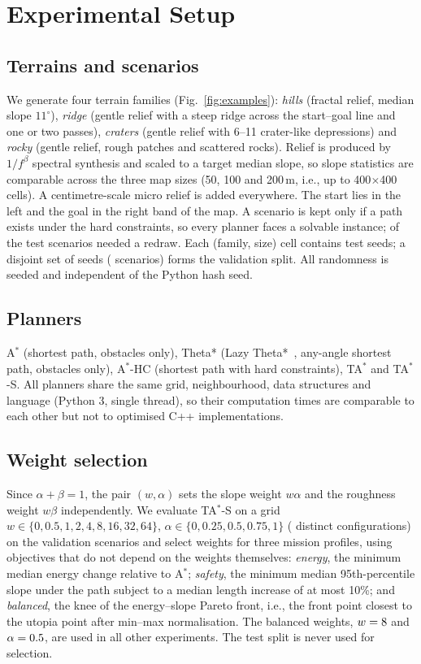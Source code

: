 \documentclass[conference]{IEEEtran}
\newcommand{\TAS}{TA$^*$-S}
\newcommand{\TA}{TA$^*$}
\newcommand{\Astar}{A$^*$}
\newcommand{\HC}{A$^*$-HC}
\begin{document}
\section{Experimental Setup}\label{sec:setup}
\subsection{Terrains and scenarios}
We generate four terrain families (Fig.~\ref{fig:examples}): \emph{hills}
(fractal relief, median slope $11^\circ$), \emph{ridge} (gentle relief with a
steep ridge across the start--goal line and one or two passes),
\emph{craters} (gentle relief with 6--11 crater-like depressions) and
\emph{rocky} (gentle relief, rough patches and scattered rocks). Relief is
produced by $1/f^\beta$ spectral synthesis and scaled to a target median slope,
so slope statistics are comparable across the three map sizes (50, 100 and
200\,m, i.e., up to 400$\times$400 cells). A centimetre-scale micro relief is
added everywhere. The start lies in the left and the goal in the right band
of the map. A scenario is kept only if a path exists under the hard
constraints, so every planner faces a solvable instance; \nRedraw{} of the
\nTest{} test scenarios needed a redraw. Each (family, size) cell contains
\nSeeds{} test seeds; a disjoint set of seeds (\nVal{} scenarios) forms the
validation split. All randomness is seeded and independent of the Python
hash seed.

\subsection{Planners}
\Astar{} (shortest path, obstacles only), Theta* (Lazy
Theta*~\cite{nash2010lazy}, any-angle shortest path, obstacles only), \HC{}
(shortest path with hard constraints), \TA{} and \TAS. All planners share the
same grid, neighbourhood, data structures and language (Python 3, single
thread), so their computation times are comparable to each other but not to
optimised C++ implementations.

\subsection{Weight selection}\label{sec:selection}
Since $\alpha+\beta=1$, the pair $(w,\alpha)$ sets the slope weight $w\alpha$ and
the roughness weight $w\beta$ independently. We evaluate \TAS{} on a grid
$w\in\{0,0.5,1,2,4,8,16,32,64\}$, $\alpha\in\{0,0.25,0.5,0.75,1\}$
(\woNConfigs{} distinct configurations) on the \woNVal{} validation scenarios and
select weights for three mission profiles, using objectives that do not depend
on the weights themselves: \emph{energy}, the minimum median energy change
relative to \Astar; \emph{safety}, the minimum median 95th-percentile slope
under the path subject to a median length increase of at most 10\%; and
\emph{balanced}, the knee of the energy--slope Pareto front, i.e., the front
point closest to the utopia point after min--max normalisation. The balanced
weights, $w=8$ and $\alpha=0.5$, are used in all other experiments.
The test split is never used for selection.
\end{document}
